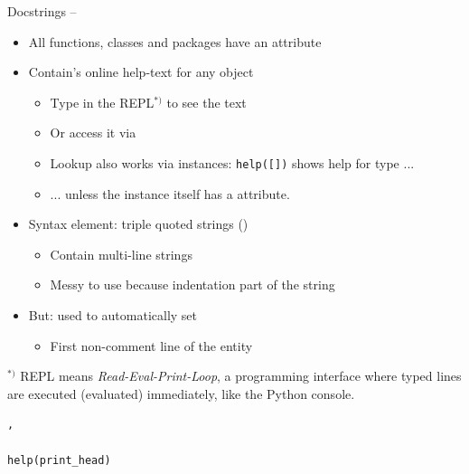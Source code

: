 
\begin{frame}[fragile]{Docstrings -- }
%
\vspace{-3pt}
\begin{itemize}
\item All functions, classes and packages have an attribute 
\item Contain's online help-text for any object
	\begin{itemize}
	\item Type  in the REPL$^{*)}$ to see the text
	\item Or access it via  
	\item Lookup also works via instances: \texttt{help([])} shows help for type  ...
	\item ... unless the instance itself has a  attribute.
	\end{itemize}
\item Syntax element: triple quoted strings ()
	\begin{itemize}
	\item Contain multi-line strings
	\item Messy to use because indentation part of the string
	\end{itemize}
\item But: used to automatically set  
	\begin{itemize}
	\item First non-comment line of the entity
	\end{itemize}
\end{itemize}
%
\vspace{-6pt}
\begin{hintbox}[REPL]
\footnotesize
$^{*)}$ REPL means \emph{Read-Eval-Print-Loop}, \ie a programming interface where typed lines are executed (evaluated) immediately, like the Python console.
\end{hintbox}
%
\end{frame}


\begin{frame}[fragile]
%
\vspace{-3pt}
\begin{codebox}
\begin{verbatim}
,

help(print_head)
\end{verbatim}
\end{codebox}
%
\end{frame}

